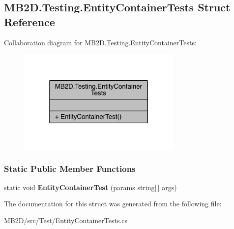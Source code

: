 \hypertarget{struct_m_b2_d_1_1_testing_1_1_entity_container_tests}{}\subsection{M\+B2\+D.\+Testing.\+Entity\+Container\+Tests Struct Reference}
\label{struct_m_b2_d_1_1_testing_1_1_entity_container_tests}


Collaboration diagram for M\+B2\+D.\+Testing.\+Entity\+Container\+Tests\+:
\nopagebreak
\begin{figure}[H]
\begin{center}
\leavevmode
\includegraphics[width=229pt]{struct_m_b2_d_1_1_testing_1_1_entity_container_tests__coll__graph}
\end{center}
\end{figure}
\subsubsection*{Static Public Member Functions}
\begin{DoxyCompactItemize}
\item 
\hypertarget{struct_m_b2_d_1_1_testing_1_1_entity_container_tests_a745b6bc43f1feb392b1e835ee86acac0}{}\label{struct_m_b2_d_1_1_testing_1_1_entity_container_tests_a745b6bc43f1feb392b1e835ee86acac0} 
static void {\bfseries Entity\+Container\+Test} (params string\mbox{[}$\,$\mbox{]} args)
\end{DoxyCompactItemize}


The documentation for this struct was generated from the following file\+:\begin{DoxyCompactItemize}
\item 
M\+B2\+D/src/\+Test/Entity\+Container\+Tests.\+cs\end{DoxyCompactItemize}
